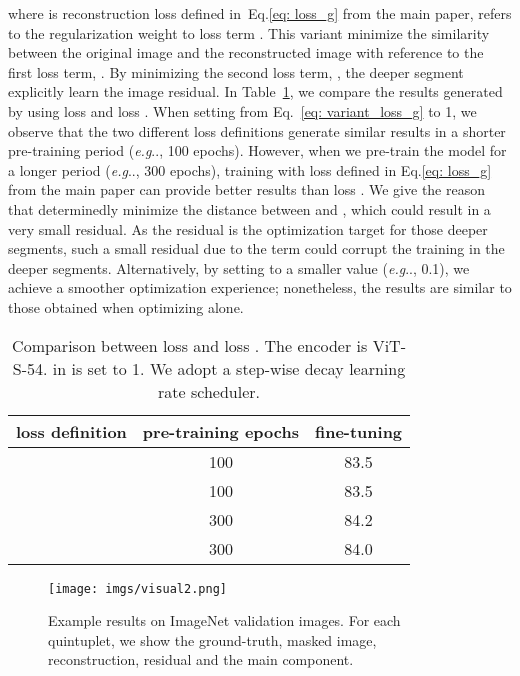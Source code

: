 \documentclass{article}
\makeatletter
\DeclareRobustCommand\onedot{\futurelet\@let@token\@onedot}
\def\@onedot{\ifx\@let@token.\else.\null\fi\xspace}
\def\eg{\emph{e.g}\onedot} \def\Eg{\emph{E.g}\onedot}
\makeatother
\begin{document}
where  is reconstruction loss defined in~Eq.\eqref{eq: loss_g} from the main paper,  refers to the regularization weight to loss term .
This variant  minimize the similarity between the original image  and the reconstructed image  with reference to the first loss term, . By minimizing the second loss term, , the deeper segment explicitly learn the image residual. In Table~\ref{tab: comp_loss_g}, we compare the results generated by using loss  and loss . When setting  from Eq.~\eqref{eq: variant_loss_g} to 1, we observe that the two different loss definitions generate similar results in a shorter pre-training period (\eg, 100 epochs). However, when we pre-train the model for a longer period (\eg, 300 epochs), training with loss  defined in Eq.\eqref{eq: loss_g} from the main paper can provide better results than loss . We give the reason that  determinedly minimize the distance between  and , which could result in a very small residual. As the residual is the optimization target for those deeper segments, such a small residual due to the  term could corrupt the training in the deeper segments. Alternatively, by setting  to a smaller value (\eg, 0.1), we achieve a smoother optimization experience; nonetheless, the results are similar to those obtained when optimizing  alone. 
\begin{table}
    \centering
    \small
    \renewcommand{\arraystretch}{1.1}
    \setlength{\tabcolsep}{10pt}
    \begin{tabular}{@{}l c c@{}}
    \toprule
    loss definition  & pre-training epochs & fine-tuning  \\
    \midrule
     & 100 &   83.5 \\
     & 100 &  83.5 \\
    \midrule
     & 300 &   84.2 \\
     & 300 &  84.0  \\
    \bottomrule
    \end{tabular}
    \caption{Comparison between loss   and loss . The encoder is ViT-S-54.  in  is set to 1. We adopt a step-wise decay learning rate scheduler.  }
    \label{tab: comp_loss_g}
\end{table}



\begin{figure}[!t]
\flushleft 
\texttt{[image: imgs/visual2.png]}
{\caption{\label{fig: visual_examples2} Example results on ImageNet validation images. For each quintuplet, we show the ground-truth, masked image, reconstruction, residual and the main component.
}}
\end{figure}
\end{document}
